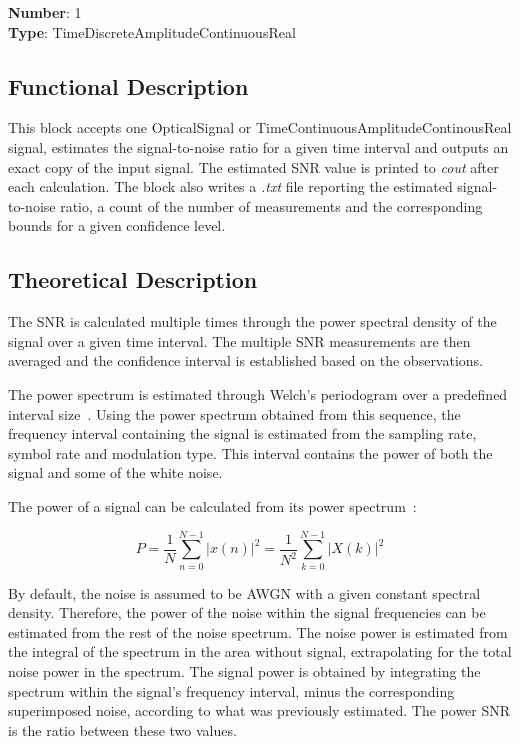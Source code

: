 \begin{refsection}
\textbf{Number}: 1\\
\textbf{Type}: TimeDiscreteAmplitudeContinuousReal

\subsection*{Functional Description}

This block accepts one OpticalSignal or TimeContinuousAmplitudeContinousReal signal, estimates the signal-to-noise ratio for a given time interval and outputs an exact copy of the input signal. The estimated SNR value is printed to \textit{cout} after each calculation.  The block also writes a \textit{.txt} file reporting the estimated signal-to-noise ratio, a count of the number of measurements and the corresponding bounds for a given confidence level.

\subsection*{Theoretical Description}\label{snrcalc}
The SNR is calculated multiple times through the power spectral density of the signal over a given time interval. The multiple SNR measurements are then averaged and the confidence interval is established based on the observations.

The power spectrum is estimated through Welch's periodogram over a predefined interval size~\cite{john2007digital}. Using the power spectrum obtained from this sequence, the frequency interval containing the signal is estimated from the sampling rate, symbol rate and modulation type. This interval contains the power of both the signal and some of the white noise.

The power of a signal can be calculated from its power spectrum~\cite{john2007digital}:

\begin{equation}
P = \frac{1}{N} \sum_{n=0}^{N-1} {|x(n)|}^2 = \frac{1}{N^2} \sum_{k=0}^{N-1} {|X(k)|}^2
\end{equation}


By default, the noise is assumed to be AWGN with a given constant spectral density. Therefore, the power of the noise within the signal frequencies can be estimated from the rest of the noise spectrum.
The noise power is estimated from the integral of the spectrum in the area without signal, extrapolating for the total noise power in the spectrum. The signal power is obtained by integrating the spectrum within the signal's frequency interval, minus the corresponding superimposed noise, according to what was previously estimated. The power SNR is the ratio between these two values.


\end{refsection}
